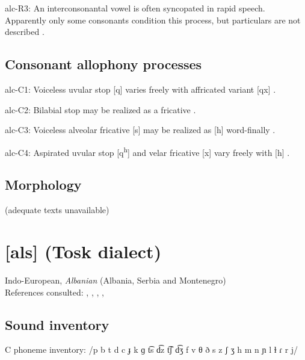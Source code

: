 {\begin{appendixdesc}
\item[alc-R3:] An interconsonantal vowel is often syncopated in rapid speech. Apparently only some consonants condition this process, but particulars are not described \citep[393]{Clairis1985}.
\end{appendixdesc}
\subsection*{Consonant allophony processes}
\begin{appendixdesc}

\item[alc-C1:] Voiceless uvular stop [q] varies freely with affricated variant [qx] \citep[378]{Clairis1985}.

\item[alc-C2:]  Bilabial stop may be realized as a fricative \citep{Aguilera2001}.

\item[alc-C3:] Voiceless alveolar fricative [s] may be realized as [h] word-finally \citep[372]{Clairis1985}.

\item[alc-C4:] Aspirated uvular stop [q\textsuperscript{h}] and velar fricative [x] vary freely with [h] \citep[377--378]{Clairis1985}.
\end{appendixdesc}
\subsection*{Morphology}

(adequate texts unavailable)

\section*{[als]  (Tosk dialect)} %
Indo-European, \textit{Albanian} (Albania, Serbia and Montenegro)\medskip\\
References consulted: \citet{Bevington1974}, \citet{Klippenstein2010}, \citet{Newmark1957}, \citet{NewmarkEtAl1982}, \citet{Trommer2013}

\subsection*{Sound inventory}
\begin{appendixdesc}

\item[C phoneme inventory:] /p b t d c ɟ k ɡ t͡s d͡z t͡ʃ d͡ʒ f v θ ð s z ʃ ʒ h m n ɲ l ɫ ɾ r j/


\end{appendixdesc}}
